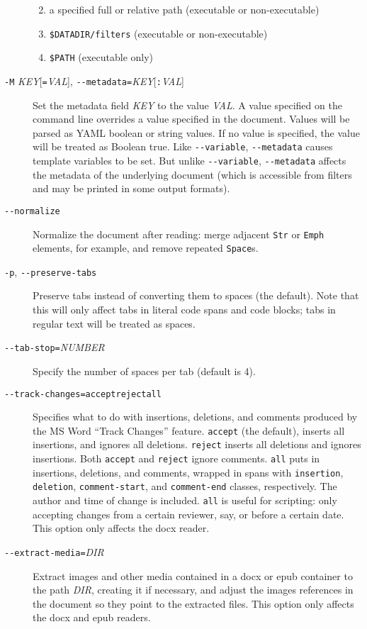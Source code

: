 \documentclass[]{article}
\begin{document}
\begin{description}
\begin{enumerate}
\def\labelenumi{\arabic{enumi}.}
\item
  a specified full or relative path (executable or non-executable)
\item
  \texttt{\$DATADIR/filters} (executable or non-executable)
\item
  \texttt{\$PATH} (executable only)
\end{enumerate}
\item[\texttt{-M} \emph{KEY}{[}\texttt{=}\emph{VAL}{]},
\texttt{-\/-metadata=}\emph{KEY}{[}\texttt{:}\emph{VAL}{]}]
Set the metadata field \emph{KEY} to the value \emph{VAL}. A value
specified on the command line overrides a value specified in the
document. Values will be parsed as YAML boolean or string values. If no
value is specified, the value will be treated as Boolean true. Like
\texttt{-\/-variable}, \texttt{-\/-metadata} causes template variables
to be set. But unlike \texttt{-\/-variable}, \texttt{-\/-metadata}
affects the metadata of the underlying document (which is accessible
from filters and may be printed in some output formats).
\item[\texttt{-\/-normalize}]
Normalize the document after reading: merge adjacent \texttt{Str} or
\texttt{Emph} elements, for example, and remove repeated
\texttt{Space}s.
\item[\texttt{-p}, \texttt{-\/-preserve-tabs}]
Preserve tabs instead of converting them to spaces (the default). Note
that this will only affect tabs in literal code spans and code blocks;
tabs in regular text will be treated as spaces.
\item[\texttt{-\/-tab-stop=}\emph{NUMBER}]
Specify the number of spaces per tab (default is 4).
\item[\texttt{-\/-track-changes=accept}\textbar{}\texttt{reject}\textbar{}\texttt{all}]
Specifies what to do with insertions, deletions, and comments produced
by the MS Word ``Track Changes'' feature. \texttt{accept} (the default),
inserts all insertions, and ignores all deletions. \texttt{reject}
inserts all deletions and ignores insertions. Both \texttt{accept} and
\texttt{reject} ignore comments. \texttt{all} puts in insertions,
deletions, and comments, wrapped in spans with \texttt{insertion},
\texttt{deletion}, \texttt{comment-start}, and \texttt{comment-end}
classes, respectively. The author and time of change is included.
\texttt{all} is useful for scripting: only accepting changes from a
certain reviewer, say, or before a certain date. This option only
affects the docx reader.
\item[\texttt{-\/-extract-media=}\emph{DIR}]
Extract images and other media contained in a docx or epub container to
the path \emph{DIR}, creating it if necessary, and adjust the images
references in the document so they point to the extracted files. This
option only affects the docx and epub readers.
\end{description}
\end{document}
